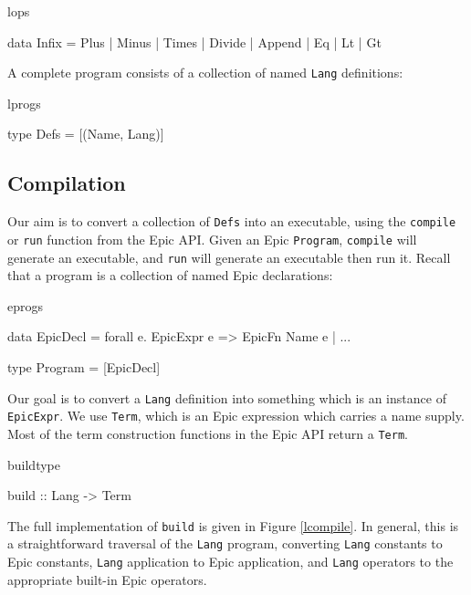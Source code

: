 \begin{SaveVerbatim}{lops}

data Infix = Plus | Minus | Times | Divide | Append | Eq | Lt | Gt

\end{SaveVerbatim}

\noindent
A complete program consists of a collection of named \texttt{Lang}
definitions:

\begin{SaveVerbatim}{lprogs}

type Defs = [(Name, Lang)]
\end{SaveVerbatim}

\subsection{Compilation}

Our aim is to convert a collection of \texttt{Defs} into an
executable, using the \texttt{compile} or \texttt{run} function from
the Epic API.
Given an Epic \texttt{Program}, \texttt{compile} will generate an
executable, and \texttt{run} will generate an executable then run it.
Recall that a program is a collection of named Epic declarations:

\begin{SaveVerbatim}{eprogs}

data EpicDecl = forall e. EpicExpr e => EpicFn Name e
              | ...

type Program = [EpicDecl]

\end{SaveVerbatim}

\noindent
Our goal is to convert a \texttt{Lang} definition into
something which is an instance of \texttt{EpicExpr}. We use
\texttt{Term}, which is an Epic expression which carries a name
supply. Most of the term construction functions in the Epic API return
a \texttt{Term}.

\begin{SaveVerbatim}{buildtype}

build :: Lang -> Term

\end{SaveVerbatim}

\noindent
The full implementation of \texttt{build} is given in Figure \ref{lcompile}.
In general, this is a straightforward traversal of the \texttt{Lang}
program, converting \texttt{Lang} constants to Epic constants,
\texttt{Lang} application to Epic application, and \texttt{Lang}
operators to the appropriate built-in Epic operators. 
                  
